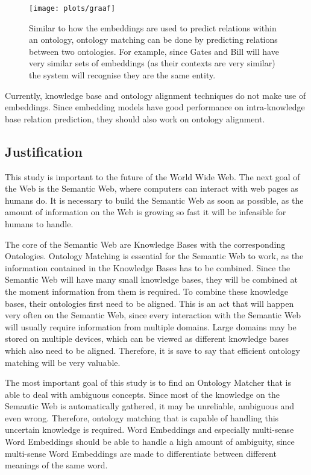 \documentclass{article}
\begin{document}
 \begin{figure}[H]
 \centering
 \texttt{[image: plots/graaf]}
 \caption{ Similar to how the embeddings are used to predict relations within an ontology, ontology matching can be done by predicting relations between two ontologies. For example, since Gates and Bill will have very similar sets of embeddings (as their contexts are very similar) the system will recognise they are the same entity.}
 \label{merge_graph}
 \end{figure}
 
 Currently, knowledge base and ontology alignment techniques do not make use of embeddings. Since embedding models have good performance on intra-knowledge base relation prediction, they should also work on ontology alignment.
 
 \subsection{Justification} 
 This study is important to the future of the World Wide Web. The next goal of the Web is the Semantic Web, where computers can interact with web pages as humans do. It is necessary to build the Semantic Web as soon as possible, as the amount of information on the Web is growing so fast it will be infeasible for humans to handle\cite{overload}.
 
 The core of the Semantic Web are Knowledge Bases with the corresponding Ontologies. Ontology Matching is essential for the Semantic Web to work, as the information contained in the Knowledge Bases has to be combined. Since the Semantic Web will have many small knowledge bases, they will be combined at the moment information from them is required. To combine these knowledge bases, their ontologies first need to be aligned. This is an act that will happen very often on the Semantic Web, since every interaction with the Semantic Web will usually require information from multiple domains. Large domains may be stored on multiple devices, which can be viewed as different knowledge bases which also need to be aligned. Therefore, it is save to say that efficient ontology matching will be very valuable.
 
 The most important goal of this study is to find an Ontology Matcher that is able to deal with ambiguous concepts. Since most of the knowledge on the Semantic Web is automatically gathered, it may be unreliable, ambiguous and even wrong. Therefore, ontology matching that is capable of handling this uncertain knowledge is required. Word Embeddings and especially multi-sense Word Embeddings should be able to handle a high amount of ambiguity, since multi-sense Word Embeddings are made to differentiate between different meanings of the same word.
 
\end{document}
